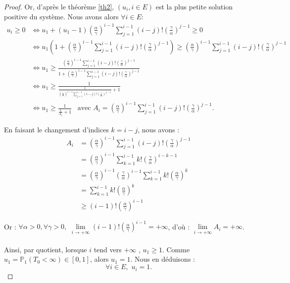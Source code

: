 \documentclass[12pt,a4paper]{report}
\theoremstyle{remark}
\begin{document}
\begin{proof}
Or, d'après le théorème \ref{th2}, $(u_i, i \in E)$ est la plus petite solution positive du système. Nous avons alors $\forall i \in E$:
\begin{align*}
u_i \geqslant 0 &\iff  u_1 + (u_1 - 1)\left(\frac{\alpha}{\gamma}\right)^{i-1} \sum_{j=1}^{i-1}(i-j)!\left(\frac{\gamma}{\alpha}\right)^{j-1} \geqslant 0 \\
&\iff u_1 \left(1 + \left(\frac{\alpha}{\gamma}\right)^{i-1} \sum_{j=1}^{i-1}(i-j)!(\frac{\gamma}{\alpha})^{j-1}\right) \geqslant  \left(\frac{\alpha}{\gamma}\right)^{i-1}\sum_{j=1}^{i-1}(i-j)!\left(\frac{\gamma}{\alpha}\right)^{j-1} \\
&\iff u_1 \geqslant \frac{ (\frac{\alpha}{\gamma})^{i-1}\sum\limits_{j=1}^{i-1}(i-j)!(\frac{\gamma}{\alpha})^{j-1}}{1 + (\frac{\alpha}{\gamma})^{i-1} \sum\limits_{j=1}^{i-1}(i-j)!(\frac{\gamma}{\alpha})^{j-1}} \\
&\iff u_1 \geqslant \frac{1}{\frac{1}{(\frac{\alpha}{\gamma})^{i-1}\sum\limits_{j=1}^{i-1}(i-j)!(\frac{\gamma}{\alpha})^{j-1}}+1}\\
&\iff u_1 \geqslant \frac{1}{\frac{1}{A_i} + 1} \, \, \, \text{ avec } A_i = \left(\frac{\alpha}{\gamma}\right)^{i-1} \sum_{j=1}^{i-1}(i-j)!\left(\frac{\gamma}{\alpha}\right)^{j-1}.
\end{align*}

En faisant le changement d'indices $k=i-j$, nous avons :
\begin{align*}
A_i &= \left(\frac{\alpha}{\gamma}\right)^{i-1} \sum_{j=1}^{i-1}(i-j)!\left(\frac{\gamma}{\alpha}\right)^{j-1} \\
&= \left(\frac{\alpha}{\gamma}\right)^{i-1} \sum_{k=1}^{i-1}k!\left(\frac{\gamma}{\alpha}\right)^{i-k-1} \\
&= \left(\frac{\alpha}{\gamma}\right)^{i-1} \left(\frac{\gamma}{\alpha}\right)^{i-1} \sum_{k=1}^{i-1}k!\left(\frac{\alpha}{\gamma}\right)^k \\
&= \sum_{k=1}^{i-1}k!\left(\frac{\alpha}{\gamma}\right)^k \\
&\geqslant (i-1)! \left(\frac{\alpha}{\gamma}\right)^{i-1}
\end{align*}

Or : $\forall \alpha > 0, \forall \gamma > 0, \, \, \lim\limits_{i \rightarrow +\infty} (i-1)! \left(\frac{\alpha}{\gamma}\right)^{i-1} = +\infty$, d'où : $\lim\limits_{i \rightarrow +\infty} A_i = +\infty$.
\\
\\
Ainsi, par quotient, lorsque $i$ tend vers $+\infty$ , $u_1 \geqslant 1$. Comme $u_1 = \mathbb{P}_{1}(T_0 < \infty) \in [0,1]$, alors $u_1=1$. Nous en déduisons  :
$$\forall i \in E, \, \, u_i = 1.$$


\end{proof}
\end{document}
